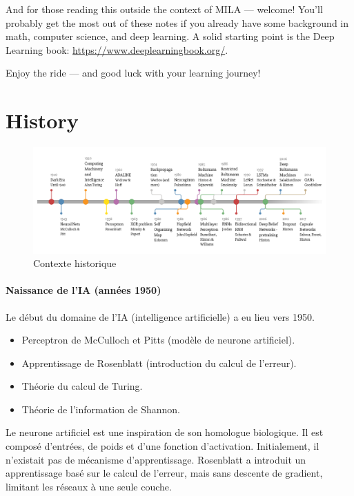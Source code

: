 \documentclass{article}
\begin{document}
And for those reading this outside the context of MILA — welcome! You’ll probably get the most out of these notes if you already have some background in math, computer science, and deep learning. A solid starting point is the Deep Learning book: \url{https://www.deeplearningbook.org/}.

Enjoy the ride — and good luck with your learning journey!

\newpage

\tableofcontents
\newpage

\section{History} \label{sec:history}

\begin{figure}[ht]
    \centering
    \includegraphics[width=1\linewidth]{graphics/S1History/ai_history.png}
    \caption{Contexte historique}
    \label{fig:ai-history}
\end{figure}

\paragraph{Naissance de l'IA (années 1950)}
Le début du domaine de l'IA (intelligence artificielle) a eu lieu vers 1950.
\begin{itemize}
    \item Perceptron de McCulloch et Pitts (modèle de neurone artificiel).
    \item Apprentissage de Rosenblatt (introduction du calcul de l'erreur).
    \item Théorie du calcul de Turing.
    \item Théorie de l'information de Shannon.
\end{itemize}

Le neurone artificiel est une inspiration de son homologue biologique. Il est composé d'entrées, de poids et d'une fonction d'activation. Initialement, il n'existait pas de mécanisme d'apprentissage. Rosenblatt a introduit un apprentissage basé sur le calcul de l'erreur, mais sans descente de gradient, limitant les réseaux à une seule couche.
\end{document}
